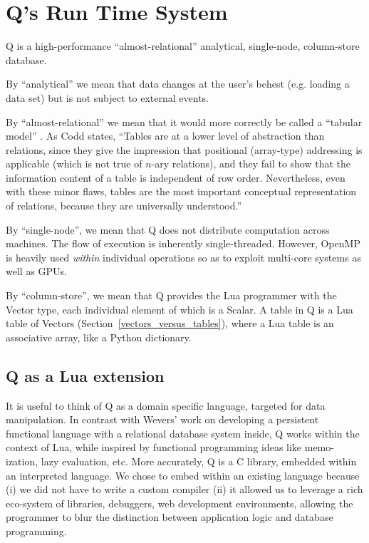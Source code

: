 \section{Q's Run Time System}

Q is a high-performance ``almost-relational'' 
analytical, single-node, column-store database. 
\be
\item 
By ``analytical'' we mean that data changes at the user's behest (e.g.
loading a data set) but is not subject to external events.
\item 
By ``almost-relational'' we mean that it would more correctly
be called a ``tabular model'' \cite{Codd1982}. As Codd states, ``Tables are
at a lower level of abstraction than relations, since they give
the impression that positional (array-type) addressing is applicable
(which is not true of \(n\)-ary relations), and they fail to
show that the information content of a table is independent
of row order. Nevertheless, even with these minor flaws,
tables are the most important conceptual representation of
relations, because they are universally understood.''
\item By ``single-node'', we mean that Q does not distribute computation across
  machines. The flow of execution is inherently single-threaded. However,
  OpenMP is heavily used {\em within} individual operations so as
  to exploit multi-core systems as well as GPUs.
\item By ``column-store'', we mean that 
Q provides the Lua programmer with the Vector type, each
individual element of which is a Scalar. A table in Q is a Lua
table of Vectors (Section~\ref{vectors_versus_tables}), where a Lua table is an
associative array, like a Python dictionary.

\ee

\subsection{Q as a Lua extension}


It is useful to think of Q as a domain specific language, targeted for data
manipulation. In contrast with Wevers' work \cite{Wevers2014} on
developing a persistent functional language with
a relational database system inside, Q works within the context of Lua, while
inspired by functional programming ideas like memo-ization, lazy evaluation,
etc.
More accurately, Q is a C library, embedded within an interpreted
language.
We chose to embed within an existing language because (i) we did not have to
write a custom compiler (ii) it allowed us to leverage a rich eco-system of
libraries, debuggers, web development environments, allowing the programmer to
blur the distinction between application logic and database programming.

